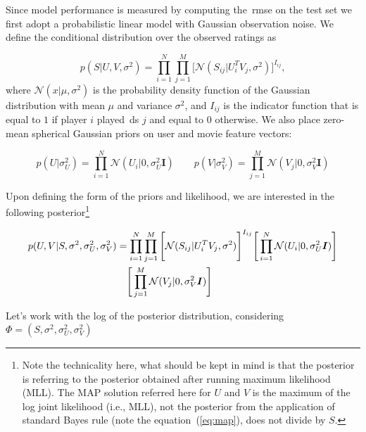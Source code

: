 Since model performance is measured by computing the~\gls{rmse} on the test set we first adopt a probabilistic linear model with Gaussian observation noise. We define the conditional distribution over the observed ratings as

\begin{equation}
p(S|U,V,\sigma^{2}) = \prod_{i=1}^{N}\prod_{j=1}^{M} \Bigg[ \mathcal{N}(S_{ij}|U^{T}_{i}V_{j},\sigma^{2}) \Bigg]^{I_{ij}},
\end{equation}
where $\mathcal{N}(x|\mu, \sigma^{2})$ is the probability density function of the Gaussian distribution with mean $\mu$ and variance $\sigma^{2}$, and $I_{ij}$ is the indicator function that is equal to $1$ if player $i$ played~\gls{ds} $j$ and equal to 0 otherwise.  We also place zero-mean spherical Gaussian priors on user and movie feature vectors:

\begin{equation}\label{eq:map}
p(U|\sigma_{U}^{2}) = \prod_{i=1}^{N}\mathcal{N}(U_{i}|0,\sigma_{U}^{2}\boldsymbol{I}) \qquad p(V|\sigma_{V}^{2}) = \prod_{j=1}^{M}\mathcal{N}(V_{j}|0,\sigma_{V}^{2}\boldsymbol{I})
\end{equation}

Upon defining the form of the priors and likelihood, we are interested in the following posterior\footnote{Note the technicality here, what should be kept in mind is that the posterior is referring to the posterior obtained after running maximum likelihood (MLL). The MAP solution referred here for $U$ and $V$ is the maximum of the log joint likelihood (i.e., MLL), not the posterior from the application of standard Bayes rule (note the equation~(\ref{eq:map}), does not divide by $S$.}

\begin{align}
\small
p(U,V|S,\sigma^{2},\sigma_{U}^{2},\sigma_{V}^{2}) &= \prod_{i=1}^{N}\prod_{j=1}^{M} \Bigg[ \mathcal{N}(S_{ij}|U^{T}_{i}V_{j},\sigma^{2}) \Bigg]^{I_{ij}}\Bigg[\prod_{i=1}^{N}\mathcal{N}(U_{i}|0,\sigma_{U}^{2}\boldsymbol{I})\Bigg] \\ &\quad \Bigg[\prod_{j=1}^{M}\mathcal{N}(V_{j}|0,\sigma_{V}^{2}\boldsymbol{I})\Bigg]
\normalsize
\end{align}


Let's work with the log of the posterior distribution, considering $\Phi = (S,\sigma^{2},\sigma_{U}^{2},\sigma_{V}^{2})$


